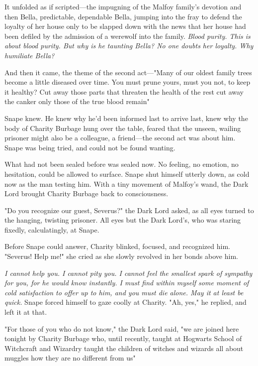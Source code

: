 It unfolded as if scripted—the impugning of the Malfoy family's devotion and then Bella, predictable, dependable Bella, jumping into the fray to defend the loyalty of her house only to be slapped down with the news that her house had been defiled by the admission of a werewolf into the family. \emph{Blood purity. This is about blood purity. But why is he taunting Bella? No one doubts her loyalty. Why humiliate Bella?}

And then it came, the theme of the second act—"Many of our oldest family trees become a little diseased over time. You must prune yours, must you not, to keep it healthy? Cut away those parts that threaten the health of the rest{\el} cut away the canker{\el} only those of the true blood remain{\el}"

Snape knew. He knew why he'd been informed last to arrive last, knew why the body of Charity Burbage hung over the table, feared that the unseen, wailing prisoner might also be a colleague, a friend—the second act was about him. Snape was being tried, and could not be found wanting.

What had not been sealed before was sealed now. No feeling, no emotion, no hesitation, could be allowed to surface. Snape shut himself utterly down, as cold now as the man testing him. With a tiny movement of Malfoy's wand, the Dark Lord brought Charity Burbage back to consciousness.

"Do you recognize our guest, Severus?" the Dark Lord asked, as all eyes turned to the hanging, twisting prisoner. All eyes but the Dark Lord's, who was staring fixedly, calculatingly, at Snape.

Before Snape could answer, Charity blinked, focused, and recognized him. "Severus! Help me!" she cried as she slowly revolved in her bonds above him.

\emph{I cannot help you. I cannot pity you. I cannot feel the smallest spark of sympathy for you, for he would know instantly. I must find within myself some moment of cold satisfaction to offer up to him, and you must die alone. May it at least be quick.} Snape forced himself to gaze coolly at Charity. "Ah, yes," he replied, and left it at that.

"For those of you who do not know," the Dark Lord said, "we are joined here tonight by Charity Burbage who, until recently, taught at Hogwarts School of Witchcraft and Wizardry{\el} taught the children of witches and wizards all about muggles{\el} how they are no different from us{\el}"

